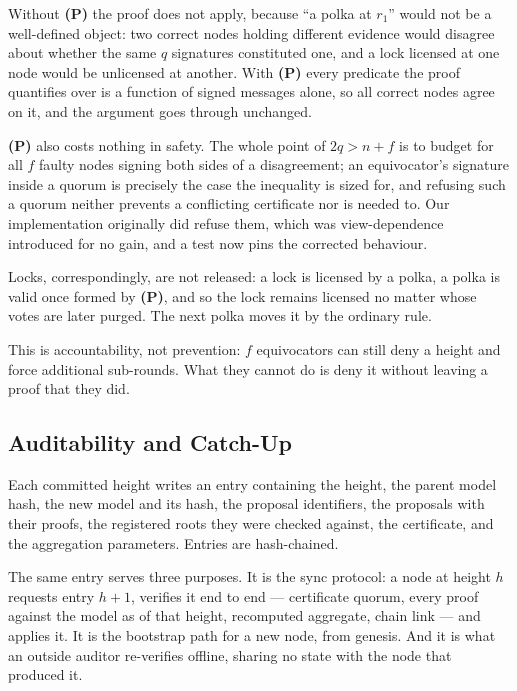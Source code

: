 \documentclass{llncs}
\begin{document}
Without \textbf{(P)} the proof does not apply, because ``a polka at $r_1$''
would not be a well-defined object: two correct nodes holding different evidence
would disagree about whether the same $q$ signatures constituted one, and a lock
licensed at one node would be unlicensed at another. With \textbf{(P)} every
predicate the proof quantifies over is a function of signed messages alone, so
all correct nodes agree on it, and the argument goes through unchanged.

\textbf{(P)} also costs nothing in safety. The whole point of $2q > n+f$ is to
budget for all $f$ faulty nodes signing both sides of a disagreement; an
equivocator's signature inside a quorum is precisely the case the inequality is
sized for, and refusing such a quorum neither prevents a conflicting certificate
nor is needed to. Our implementation originally did refuse them, which was
view-dependence introduced for no gain, and a test now pins the corrected
behaviour.

Locks, correspondingly, are not released: a lock is licensed by a polka, a polka
is valid once formed by \textbf{(P)}, and so the lock remains licensed no matter
whose votes are later purged. The next polka moves it by the ordinary rule.

This is accountability, not prevention: $f$ equivocators can still deny a height
and force additional sub-rounds. What they cannot do is deny it without leaving
a proof that they did.

\subsection{Auditability and Catch-Up}

Each committed height writes an entry containing the height, the parent model
hash, the new model and its hash, the proposal identifiers, the proposals with
their proofs, the registered roots they were checked against, the certificate,
and the aggregation parameters. Entries are hash-chained.

The same entry serves three purposes. It is the sync protocol: a node at height
$h$ requests entry $h+1$, verifies it end to end --- certificate quorum, every
proof against the model as of that height, recomputed aggregate, chain link ---
and applies it. It is the bootstrap path for a new node, from genesis. And it is
what an outside auditor re-verifies offline, sharing no state with the node that
produced it.

\end{document}
